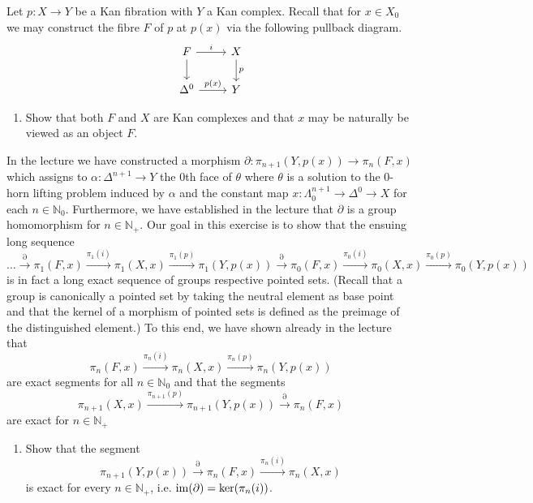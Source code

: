 \begin{Exercise}
    
Let $p: X  \to Y$ be a Kan fibration with $ Y $ a Kan complex. 
Recall that for $ x \in X_0 $ we may construct the fibre $ F $ of $ p $ at $ p ( x ) $ via the following pullback diagram.
\[
\begin{tikzcd}
    F 
    \ar[r, "i"]
    \dar
    &
    X
    \ar[d,"p"]
    \\
    \Delta^0
    \ar[r,"p(x)"]
    &
    Y
\end{tikzcd}
\]

\begin{enumerate}
    \item 
    Show that both $ F $ and $ X $ are Kan complexes and that $ x $ may be naturally be viewed as an object $ F $.
    
\end{enumerate}

In the lecture we have constructed a morphism $ \partial : \pi_{n+1} ( Y , p ( x ) ) \to \pi_n ( F , x ) $ which assigns to $\alpha : \Delta^{ n + 1 } \to Y $ the 0th face of $ \theta $ where $ \theta $ is a solution to the 0-horn lifting problem induced by $ \alpha $ and the constant map $ x : \Lambda_0^{n+1} \to \Delta^0 \to X $ for each $ n \in \mathbb{N}_0$.
Furthermore, we have established in the lecture that $\partial$ is a group homomorphism for $ n \in \mathbb{N}_+ $.
Our goal in this exercise is to show that the ensuing long sequence
\[
    \dotsc 
    \xrightarrow{\partial}
    \pi_1 ( F , x ) 
    \xrightarrow{\pi_1(i)}
    \pi_1 ( X , x )
    \xrightarrow{\pi_1 ( p )}
    \pi_1 ( Y , p ( x ) )
    \xrightarrow{\partial}
    \pi_0 ( F , x ) 
    \xrightarrow{\pi_0(i)}
    \pi_0(X,x)
    \xrightarrow{\pi_0(p)}
    \pi_0(Y,p(x))
\]
is in fact a long exact sequence of groups respective pointed sets.
(Recall that a group is canonically a pointed set by taking the neutral element as base point and that the kernel of a morphism of pointed sets is defined as the preimage of the distinguished element.) 
To this end, we have shown already in the lecture that 
\[
    \pi_n( F , x ) 
    \xrightarrow{\pi_n(i)}
    \pi_n ( X ,x ) 
    \xrightarrow{\pi_n ( p )}
    \pi_n( Y , p ( x )  )
\]
are exact segments for all $ n \in \mathbb{ N }_0 $ and that the segments
\[
    \pi_{n+1}( X , x )
    \xrightarrow{\pi_{n+1}(p)}
    \pi_{n+1} ( Y , p ( x ) ) 
    \xrightarrow{ \partial }
    \pi_n ( F , x )
\]
are exact for $ n \in \mathbb{N}_+ $

\begin{enumerate}[label=(\alph*), resume]
    \item 
    Show that the segment 
    \[
        \pi_{n+1} ( Y , p ( x ) ) 
        \xrightarrow{ \partial }
        \pi_n ( F , x )
        \xrightarrow{ \pi_n ( i ) }
        \pi_n ( X , x ) 
    \]
    is exact for every $ n \in \mathbb{ N }_+ $, i.e. $\operatorname{im} ( \partial ) = \ker ( \pi_n ( i ) ) $.
\end{enumerate}


\end{Exercise}
